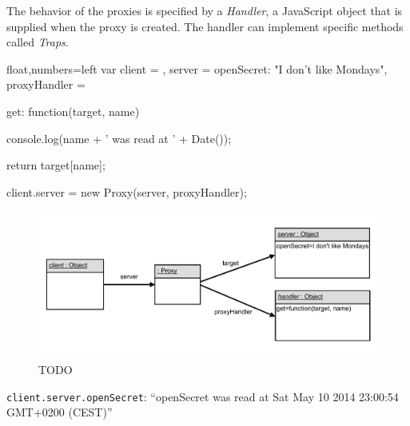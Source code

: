 The behavior of the proxies is specified by a \emph{Handler}, a JavaScript object that is supplied when the proxy is created.
The handler can implement specific methods called \emph{Traps}.

\begin{code}{}{float,numbers=left}
var client = {},
    server = {openSecret: "I don't like Mondays"},
    proxyHandler = {
        get: function(target, name) {
            console.log(name + ' was read at ' + Date());
            
            return target[name];
        }
    }

client.server = new Proxy(server, proxyHandler);
\end{code}
\label{lst:loggingProxy}
\iffalse
\end{verbatim}\fi


\begin{figure}[h]
    \centering
    \includegraphics[width=\textwidth]{figures/5_implementation/1_loggingProxy.pdf}
    \caption{TODO}
    \label{fig:LoggingProxy}
\end{figure}


\lstinline{client.server.openSecret}: ``openSecret was read at Sat May 10 2014 23:00:54 GMT+0200 (CEST)''




